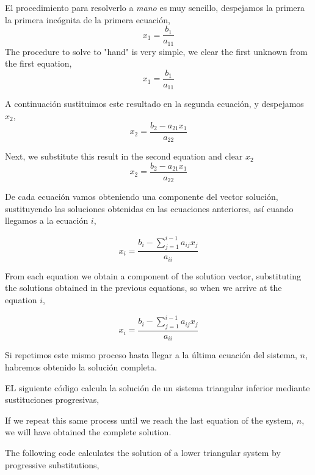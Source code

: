 \begin{paracol}{2}
El procedimiento para resolverlo a \emph{mano} es muy sencillo,
despejamos la primera la primera incógnita de la primera ecuación,
\begin{equation*}
x_1=\frac{b_1}{a_{11}}
\end{equation*}
\switchcolumn  
The procedure to solve to "hand" is very simple,
we clear the first unknown from the first equation,
\begin{equation*}
x_1=\frac{b_1}{a_{11}}
\end{equation*}

\switchcolumn
A continuación sustituimos este resultado en la segunda ecuación, y despejamos $x_2$,
\begin{equation*}
x_2=\frac{b_2-a_{21}x_1}{a_{22}}
\end{equation*}

\switchcolumn
Next, we substitute this result in the second equation and clear $x_2$
\begin{equation*}
x_2=\frac{b_2-a_{21}x_1}{a_{22}}
\end{equation*}

\switchcolumn

De cada ecuación vamos obteniendo una componente del vector solución, sustituyendo las soluciones obtenidas en las ecuaciones anteriores, así cuando llegamos a la ecuación $i$,

\begin{equation*}
x_i=\frac{b_i-\sum_{j=1}^{i-1}a_{ij}x_j}{a_{ii}}
\end{equation*}

\switchcolumn
From each equation we obtain a component of the solution vector, substituting the solutions obtained in the previous equations, so when we arrive at the equation $i$,

\begin{equation*}
x_i=\frac{b_i-\sum_{j=1}^{i-1}a_{ij}x_j}{a_{ii}}
\end{equation*}

\switchcolumn
Si repetimos este mismo proceso hasta llegar a la última ecuación del sistema, $n$, habremos obtenido la solución completa.

EL siguiente código calcula la solución de un sistema triangular inferior mediante sustituciones progresivas,

\switchcolumn

If we repeat this same process until we reach the last equation of the system, $n$, we will have obtained the complete solution.

The following code calculates the solution of a lower triangular system by progressive substitutions,
\end{paracol}

